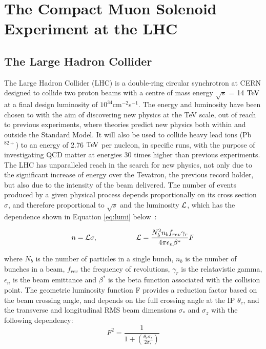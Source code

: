 \chapter{The Compact Muon Solenoid Experiment at the LHC}
\section{The Large Hadron Collider}

The Large Hadron Collider (LHC) is a double-ring circular synchrotron at CERN designed to collide two proton beams with a centre of mass energy $\sqrt{s}$  = 14 $\text{TeV}$ at a final design luminosity of $10^{34}$cm$^{-2}$s$^{-1}$. The energy and luminosity have been chosen to with the aim of discovering new physics at the TeV scale, out of reach to previous experiments, where theories predict new physics both within and outside the Standard Model. It will also be used to collide heavy lead ions (Pb$^{82+}$) to an energy of 2.76 $\text{TeV}$  per nucleon, in specific runs, with the purpose of investigating QCD matter at energies 30 times higher than previous experiments. 
The LHC has unparalleled reach in the search for new physics, not only due to the significant increase of energy over the Tevatron, the previous record holder, but also due to the intensity of the beam delivered. The number of events produced by a given physical process depends proportionally on its cross section $\sigma$, and therefore proportional to $\sqrt{s}$ and the luminosity $\mathcal{L}$, which has the dependence shown in Equation \ref{eq:lumi} below~\cite{LHCDesign}:

\begin{equation}
n = \mathcal{L} \sigma, \hspace{.75in} \mathcal{L} = \frac{N_{b}^{2} n_{b} f_{rev} \gamma_{r}}{4 \pi \epsilon_{n} \beta^{*}}F
\label{eq:lumi}
\end{equation}

where $N_{b}$ is the number of particles in a single bunch, $n_{b}$ is the number of bunches in a beam, $f_{rev}$ the frequency of revolutions, $\gamma_{r}$ is the relatavistic gamma, $\epsilon_{n}$ is the beam emittance and $\beta^{*}$ is the beta function associated with the collision point. The geometric luminosity function F provides a reduction factor based on the beam crossing angle, and depends on the full crossing angle at the IP $\theta_{c}$, and the transverse and longitudinal RMS beam dimensions $\sigma_{*}$ and $\sigma_{z}$ with the following dependency:
\begin{equation}
F^{2} = \frac{1}{1+(\frac{\theta_{c} \sigma_{z}}{2\sigma_{*}})}
\label{eq:lumi2}
\end{equation}

